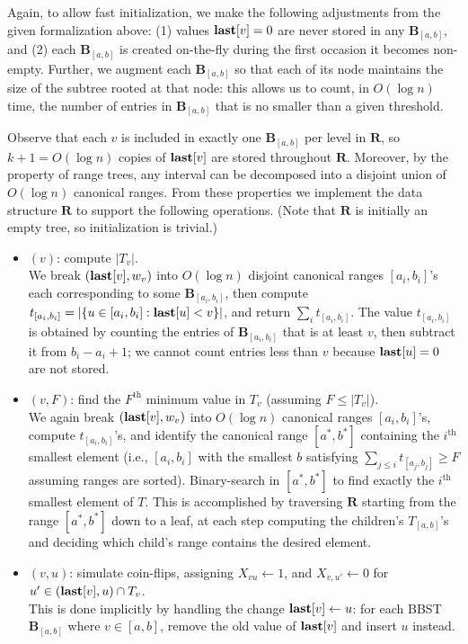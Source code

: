 Again, to allow fast initialization, we make the following adjustments from the given formalization above: (1) values $\mathbf{last}[v] = 0$ are never stored in any $\mathbf{B}_{[a,b]}$, and (2) each $\mathbf{B}_{[a,b]}$ is created on-the-fly during the first occasion it becomes non-empty. Further, we augment each $\mathbf{B}_{[a,b]}$ so that each of its node maintains the size of the subtree rooted at that node: this allows us to count, in $O(\log n)$ time, the number of entries in $\mathbf{B}_{[a,b]}$ that is no smaller than a given threshold.

Observe that each $v$ is included in exactly one $\mathbf{B}_{[a,b]}$ per level in $\mathbf{R}$, so $k+1=O(\log n)$ copies of $\mathbf{last}[v]$ are stored throughout $\mathbf{R}$. Moreover, by the property of range trees, any interval can be decomposed into a disjoint union of $O(\log n)$ canonical ranges. From these properties we implement the data structure $\mathbf{R}$ to support the following operations. (Note that $\mathbf{R}$ is initially an empty tree, so initialization is trivial.)
\begin{itemize}
\item {}$(v)$: compute $|T_v|$. \\
We break $(\mathbf{last}[v],w_v)$ into $O(\log n)$ disjoint canonical ranges $[a_i, b_i]$'s each corresponding to some $\mathbf{B}_{[a_i,b_i]}$, then compute $t_{[a_i,b_i]} =|\{u \in [a_i, b_i]: \mathbf{last}[u] < v\}|$, and return $\sum_i t_{[a_i,b_i]}$. The value $t_{[a_i, b_i]}$ is obtained by counting the entries of $\mathbf{B}_{[a_i, b_i]}$ that is at least $v$, then subtract it from $b_i-a_i+1$; we cannot count entries less than $v$ because $\mathbf{last}[u]=0$ are not stored.
\item {}$(v,F)$: find the $F^\textrm{th}$ minimum value in $T_v$ (assuming $F \leq |T_v|$). \\
We again break $(\mathbf{last}[v],w_v)$ into $O(\log n)$ canonical ranges $[a_i, b_i]$'s, compute $t_{[a_i, b_i]}$'s, and identify the canonical range $[a^*,b^*]$ containing the $i^\textrm{th}$ smallest element (i.e., $[a_i, b_i]$ with the smallest $b$ satisfying $\sum_{j \leq i} t_{[a_j,b_j]} \geq F$ assuming ranges are sorted). Binary-search in $[a^*,b^*]$ to find exactly the $i^\textrm{th}$ smallest element of $T$. This is accomplished by traversing $\mathbf{R}$ starting from the range $[a^*,b^*]$ down to a leaf, at each step computing the children's $T_{[a,b]}$'s and deciding which child's range contains the desired element.
\item {}$(v,u)$: simulate coin-flips, assigning $X_{vu} \leftarrow 1$, and $X_{v,u'} \leftarrow 0$ for $u' \in (\mathbf{last}[v], u) \cap T_v$. \\
This is done implicitly by handling the change $\mathbf{last}[v] \leftarrow u$: for each BBST $\mathbf{B}_{[a,b]}$ where $v \in [a, b]$, remove the old value of $\mathbf{last}[v]$ and insert $u$ instead.
\end{itemize}
